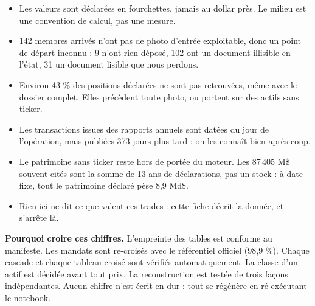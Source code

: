 \documentclass[10pt,a4paper]{article}
\newcommand{\pts}[1]{{\footnotesize\begin{itemize}#1\end{itemize}}\vspace{0.9mm}}
\begin{document}
{\begin{tcolorbox}
\pts{
\item Les valeurs sont déclarées en fourchettes, jamais au dollar près. Le milieu est une convention de
calcul, pas une mesure.
\item 142 membres arrivés n'ont pas de photo d'entrée exploitable, donc un point de départ inconnu :
9 n'ont rien déposé, 102 ont un document illisible en l'état, 31 un document lisible que nous perdons.
\item Environ 43 \% des positions déclarées ne sont pas retrouvées, même avec le dossier complet. Elles
précèdent toute photo, ou portent sur des actifs sans ticker.
\item Les transactions issues des rapports annuels sont datées du jour de l'opération, mais publiées
373 jours plus tard : on les connaît bien après coup.
\item Le patrimoine sans ticker reste hors de portée du moteur. Les 87\,405 M\$ souvent cités sont la
somme de 13 ans de déclarations, pas un stock : à date fixe, tout le patrimoine déclaré pèse 8,9 Md\$.
\item Rien ici ne dit ce que valent ces trades : cette fiche décrit la donnée, et s'arrête là.
}
{\footnotesize\textbf{Pourquoi croire ces chiffres.} L'empreinte des tables est conforme au manifeste.
Les mandats sont re-croisés avec le référentiel officiel (98,9 \%). Chaque cascade et chaque tableau
croisé sont vérifiés automatiquement. La classe d'un actif est décidée avant tout prix. La reconstruction
est testée de trois façons indépendantes. Aucun chiffre n'est écrit en dur : tout se régénère en
ré-exécutant le notebook.}
\end{tcolorbox}}
\vspace*{\fill}
\end{document}
